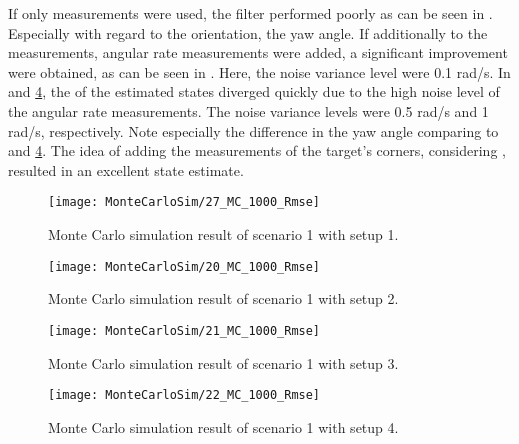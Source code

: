 If only \abbrROI measurements were used, the filter performed poorly as can be seen in .
Especially with regard to the orientation, \ie the yaw angle.
If additionally to the \abbrROI measurements, angular rate measurements were added, a significant improvement were obtained, as can be seen in .
Here, the noise variance level were 0.1 rad/s.
In  and \ref{fig:22montesimstraighttowardsroiangvelrmse}, the \abbrRMSE of the estimated states diverged quickly due to the high noise level of the angular rate measurements.
The noise variance levels were 0.5 rad/s and 1 rad/s, respectively.
Note especially the difference in the yaw angle comparing  to  and \ref{fig:22montesimstraighttowardsroiangvelrmse}.
The idea of adding the measurements of the target's corners, considering , resulted in an excellent state estimate.

\begin{figure}[!ht]
	\centering
	\texttt{[image: MonteCarloSim/27\_MC\_1000\_Rmse]}
	\caption{\label{fig:27montesimstraighttowardsroirmse} Monte Carlo simulation result of scenario 1 with setup 1.}
\end{figure}

\begin{figure}[!ht]
	\centering
	\texttt{[image: MonteCarloSim/20\_MC\_1000\_Rmse]}
	\caption{\label{fig:20montesimstraighttowardsroiangvelrmse} Monte Carlo simulation result of scenario 1 with setup 2.}
\end{figure}

\begin{figure}[!ht]
	\centering
	\texttt{[image: MonteCarloSim/21\_MC\_1000\_Rmse]}
	\caption{\label{fig:21montesimstraighttowardsroiangvelrmse} Monte Carlo simulation result of scenario 1 with setup 3.}
\end{figure}

\begin{figure}[!ht]
	\centering
	\texttt{[image: MonteCarloSim/22\_MC\_1000\_Rmse]}
	\caption{\label{fig:22montesimstraighttowardsroiangvelrmse} Monte Carlo simulation result of scenario 1 with setup 4.}
\end{figure}

